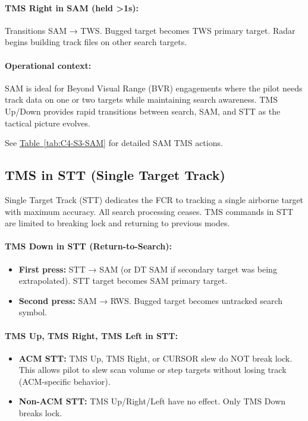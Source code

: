\documentclass[11pt, a4paper, twoside]{report}
\newcommand{\tabref}[1]{\hyperref[#1]{Table~\ref*{#1}}}
\begin{document}
\paragraph{TMS Right in SAM (held >1s):}
Transitions SAM → TWS. Bugged target becomes TWS primary target. Radar begins building track files on other search targets.

\paragraph{Operational context:}
SAM is ideal for Beyond Visual Range (BVR) engagements where the pilot needs track data on one or two targets while maintaining search awareness. TMS Up/Down provides rapid transitions between search, SAM, and STT as the tactical picture evolves.

See \tabref{tab:C4-S3-SAM} for detailed SAM TMS actions.

\subsection{TMS in STT (Single Target Track)}
\label{sec:C4-S3-S2}

Single Target Track (STT) dedicates the FCR to tracking a single airborne target with maximum accuracy. All search processing ceases. TMS commands in STT are limited to breaking lock and returning to previous modes.

\paragraph{TMS Down in STT (Return-to-Search):}
\begin{itemize}
    \item \textbf{First press:} STT → SAM (or DT SAM if secondary target was being extrapolated). STT target becomes SAM primary target.
    \item \textbf{Second press:} SAM → RWS. Bugged target becomes untracked search symbol.
\end{itemize}

\paragraph{TMS Up, TMS Right, TMS Left in STT:}
\begin{itemize}
    \item \textbf{ACM STT:} TMS Up, TMS Right, or CURSOR slew do NOT break lock. This allows pilot to slew scan volume or step targets without losing track (ACM-specific behavior).
    \item \textbf{Non-ACM STT:} TMS Up/Right/Left have no effect. Only TMS Down breaks lock.
\end{itemize}
\end{document}
